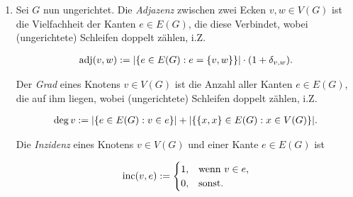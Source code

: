 \begin{definition}
\begin{enumerate}[
                wide,
                labelindent = 0pt
            ]
                \item Sei $G$ nun ungerichtet.
                Die \textit{Adjazenz} zwischen zwei Ecken $v, w \in V(G)$ ist die Vielfachheit der Kanten $e \in E(G)$, die diese Verbindet, wobei (ungerichtete) Schleifen doppelt zählen, i.Z.

                \begin{align*}
                    \operatorname{adj}(v, w)
                    :=
                    |{\left \{ e \in E(G): e = {\left \{ v, w \right \}} \right \}}| \cdot (1 + \delta_{v, w}).
                \end{align*}

                Der \textit{Grad} eines Knotens $v \in V(G)$ ist die Anzahl aller Kanten $e \in E(G)$, die auf ihm liegen, wobei (ungerichtete) Schleifen doppelt zählen, i.Z.

                \begin{align*}
                    \deg v
                    :=
                    |{\left \{ e \in E(G): v \in e \right \}}|
                    +
                    |{\left \{ {\left \{ x, x \right \}} \in E(G): x \in V(G) \right \}}|.
                \end{align*}

                Die \textit{Inzidenz} eines Knotens $v \in V(G)$ und einer Kante $e \in E(G)$ ist

                \begin{align*}
                    \operatorname{inc}(v, e)
                    :=
                    \begin{cases}
                        1, & \text{wenn}~ v \in e, \\
                        0, & \text{sonst}.
                    \end{cases}
                \end{align*}

            \end{enumerate}

        \end{definition}

